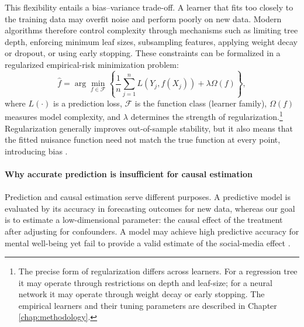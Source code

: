 \documentclass[11pt,oneside,a4paper]{book}
\begin{document}
This flexibility entails a bias–variance trade-off. A learner that fits too closely to the training data may overfit noise and perform poorly on new data. Modern algorithms therefore control complexity through mechanisms such as limiting tree depth, enforcing minimum leaf sizes, subsampling features, applying weight decay or dropout, or using early stopping. These constraints can be formalized in a regularized empirical-risk minimization problem: 
\begin{equation*}
\widehat{f}
=
\arg\min_{f\in\mathcal{F}}
\left\{
\frac{1}{n}\sum_{j=1}^{n}L\!\left(Y_j,f(X_j)\right)
+\lambda\Omega(f)
\right\},
\end{equation*}
where \(L(\cdot)\) is a prediction loss, \(\mathcal{F}\) is the function class (learner family), \(\Omega(f)\) measures model complexity, and \(\lambda\) determines the strength of regularization.\footnote{The precise form of regularization differs across learners. For a regression tree it may operate through restrictions on depth and leaf-size; for a neural network it may operate through weight decay or early stopping. The empirical learners and their tuning parameters are described in Chapter \ref{chap:methodology}.} Regularization generally improves out-of-sample stability, but it also means that the fitted nuisance function need not match the true function at every point, introducing bias \citep{chernozhukov2018dml,fuhr2024dml,helal2026returns}.\\
\\
\textbf{Why accurate prediction is insufficient for causal estimation}\\
\\
Prediction and causal estimation serve different purposes. A predictive model is evaluated by its accuracy in forecasting outcomes for new data, whereas our goal is to estimate a low-dimensional parameter: the causal effect of the treatment after adjusting for confounders. A model may achieve high predictive accuracy for mental well-being yet fail to provide a valid estimate of the social-media effect \citep{shmueli2010explain,mullainathan2017machine,helal2026returns}.
\end{document}

